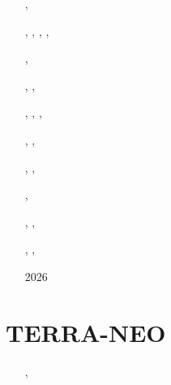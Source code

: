 \begin{small}
\begin{itemize}
\item[\twothousandtwelve]      \textcite{dagd12},  \textcite{shbs12}
\item[\twothousandthirteen]    \textcite{dadb13},  \textcite{oflb13}, \textcite{wahe13},
                               \textcite{wahk13},  \textcite{wahe13b}
\item[\twothousandfourteen]    \textcite{butm14}
\item[\twothousandfifteen]     \textcite{amsb15},  \textcite{cobs15}
\item[\twothousandsixteen]     \textcite{vade16},  \textcite{necg16}, \textcite{pric16}
\item[\twothousandseventeen]   \textcite{woda17},  \textcite{badw17}, \textcite{rubh17},
                               \textcite{wahe17} 
\item[\twothousandeighteen]    \textcite{ghbu18},  \textcite{cogb18}, \textcite{prda18}
\item[\twothousandnineteen]    \textcite{prdp19}
\item[\twothousandtwenty]      \textcite{cobo20}
\item[\twothousandtwentyone]   \textcite{ghbo21}
\item[\twothousandtwentytwo]   \textcite{licw22},  \textcite{brcb22}, \textcite{pade22}
\item[\twothousandtwentythree] \textcite{tabs23},  \textcite{padm23}
\item[\twothousandtwentyfour]  \textcite{pldp24},  \textcite{cawc24}, \textcite{omrp24}
\item[\twothousandtwentyfive]  \textcite{padk25},  \textcite{nopw25}, \textcite{lewk25}
\item[2026]                    \textcite{redp26}
\end{itemize}
\end{small}


\section{TERRA-NEO} 

\begin{small}
\begin{itemize}
\item[\twothousandfifteen] \textcite{gmrs15}, \textcite{wegg15}
\item[\twothousandtwenty]  \textcite{babd20}
\end{itemize}
\end{small}

